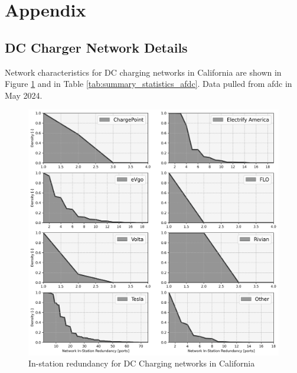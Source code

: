 \newpage
\appendix

\section*{Appendix}

\subsection*{DC Charger Network Details}

Network characteristics for DC charging networks in California are shown in Figure \ref{fig:ris_top_networks} and in Table \ref{tab:summary_statistics_afdc}. Data pulled from \gls{afdc} in May 2024.

\begin{figure}[H]
	\centering
	\includegraphics[width = \linewidth]{figs/California_RIS_SF_All.png}
	\caption{In-station redundancy for DC Charging networks in California}
	\label{fig:ris_top_networks}
\end{figure}

